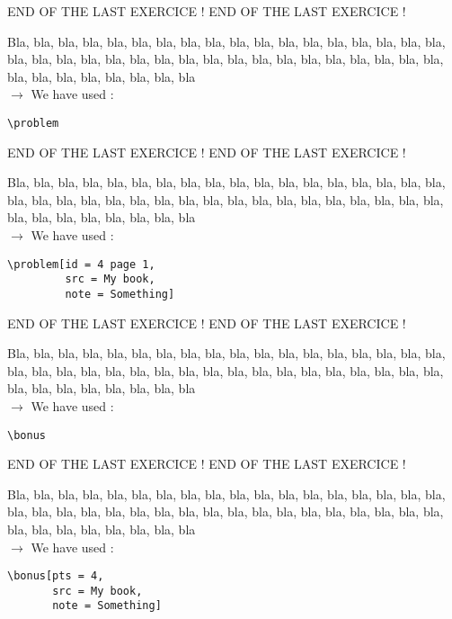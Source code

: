 \documentclass[12pt]{article}
\newcommand\blabla{%
		\noindent Bla, bla, bla, bla, bla, bla, bla, bla, bla, bla, bla,
		bla, bla, bla, bla, bla, bla, bla, bla, bla, bla, bla,
		bla, bla, bla, bla, bla, bla, bla, bla, bla, bla, bla,
		bla, bla, bla, bla, bla, bla, bla, bla, bla, bla, bla
	}
\newcommand\codeused{
		\blabla{} \medskip  \\ \noindent $\rightarrow$ We have used :
	}
\begin{document}
\newpage \medskip \noindent END OF THE LAST EXERCICE ! END OF THE LAST EXERCICE !

\problem

\codeused{}
\begin{verbatim}
\problem
\end{verbatim}


\newpage \medskip \noindent END OF THE LAST EXERCICE ! END OF THE LAST EXERCICE !

\problem[id = 4 page 1, src = My book, note = Something]

\codeused{}
\begin{verbatim}
\problem[id = 4 page 1, 
         src = My book, 
         note = Something]
\end{verbatim}




\newpage \medskip \noindent END OF THE LAST EXERCICE ! END OF THE LAST EXERCICE !

\bonus

\codeused{}
\begin{verbatim}
\bonus
\end{verbatim}



\newpage \medskip \noindent END OF THE LAST EXERCICE ! END OF THE LAST EXERCICE !

\bonus[pts = 4, src = My book, note = Something]

\codeused{}
\begin{verbatim}
\bonus[pts = 4, 
       src = My book, 
       note = Something]
\end{verbatim}
\end{document}
